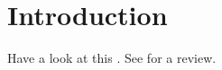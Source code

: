\chapter*{Introduction}

Have a look at this \cite{KapustaGale_2007}. See \cite{BuszaEtAl_2018} for a review.